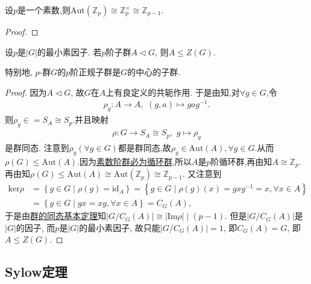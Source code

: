 \documentclass[../../main.tex]{subfiles}%
\begin{document}
\begin{proposition}\label{proposition:Zp自同构群同构Z_p-1}
设$p$是一个素数,则$\text{Aut}(\mathbb{Z}_p)\cong\mathbb{Z}_{p}^{\times} \cong \mathbb{Z}_{p-1}$.
\end{proposition}
\begin{proof}



\end{proof}

\begin{example}
设$p$是$|G|$的最小素因子. 若$p$阶子群$A \lhd G$, 则$A \leqslant Z(G)$.

特别地, $p$-群$G$的$p$阶正规子群是$G$的中心的子群.
\end{example}
\begin{proof}

因为$A \lhd G$, 故$G$在$A$上有良定义的共轭作用. 于是由知,对$\forall g\in G$,令
\begin{align*}
\rho_g: A\to A,\,\,(g,a)\mapsto gag^{-1}.
\end{align*}
则$\rho_g\in =S_A\cong S_p$.并且映射
\begin{align*}
\rho: G \to S_A \cong S_p,\,\,g\mapsto \rho_g
\end{align*}
是群同态.
注意到$\rho_g(\forall g\in G)$都是群同态,故$\rho_g\in \text{Aut}(A),\forall g\in G$.从而$\rho(G)\leqslant \mathrm{Aut}(A) $.因为\hyperref[proposition:素数阶群必为循环群]{素数阶群必为循环群},所以$A$是$p$阶循环群,再由知$A\cong \mathbb{Z}_p$.
再由知$\rho(G)\leqslant\mathrm{Aut}(A)\cong \mathrm{Aut}(\mathbb{Z}_p)\cong \mathbb{Z}_{p-1}$.
又注意到
\begin{align*}
\mathrm{ker}\rho &=\left\{ g\in G\mid \rho \left( g \right) =\mathrm{id}_A \right\} =\left\{ g\in G\mid \rho \left( g \right) \left( x \right) =gxg^{-1}=x,\forall x\in A \right\} 
\\
&=\left\{ g\in G\mid gx=xg,\forall x\in A \right\} =C_G(A),
\end{align*}
于是由\hyperref[theorem:群的同态基本定理]{群的同态基本定理}知$|G/C_G(A)| \cong |\mathrm{Im}\rho| \mid (p-1)$. 但是$|G/C_G(A)|$是$|G|$的因子, 而$p$是$|G|$的最小素因子, 故只能$|G/C_G(A)| = 1$, 即$C_G(A) = G$, 即$A \leqslant Z(G)$.

\end{proof}


\subsection{Sylow定理}
\end{document}
